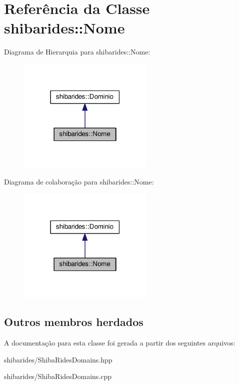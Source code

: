 \hypertarget{classshibarides_1_1Nome}{}\section{Referência da Classe shibarides\+:\+:Nome}
\label{classshibarides_1_1Nome}


Diagrama de Hierarquia para shibarides\+:\+:Nome\+:\nopagebreak
\begin{figure}[H]
\begin{center}
\leavevmode
\includegraphics[width=183pt]{classshibarides_1_1Nome__inherit__graph}
\end{center}
\end{figure}


Diagrama de colaboração para shibarides\+:\+:Nome\+:\nopagebreak
\begin{figure}[H]
\begin{center}
\leavevmode
\includegraphics[width=183pt]{classshibarides_1_1Nome__coll__graph}
\end{center}
\end{figure}
\subsection*{Outros membros herdados}


A documentação para esta classe foi gerada a partir dos seguintes arquivos\+:\begin{DoxyCompactItemize}
\item 
shibarides/Shiba\+Rides\+Domains.\+hpp\item 
shibarides/Shiba\+Rides\+Domains.\+cpp\end{DoxyCompactItemize}
